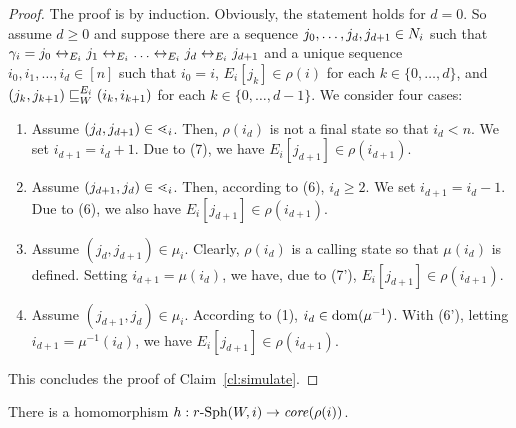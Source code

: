 \documentclass{LMCS}
\begin{document}
\begin{proof}
  The proof is by induction. Obviously, the statement holds for $d=0$. So
  assume $d \ge 0$ and suppose there are a sequence $j_0,\ldots,j_d,j_{d+1}
  \in \Nat_{i}$ such that $\gamma_{i} = j_0 \edge{E_i} j_1 \edge{E_i} \ldots
  \edge{E_i} j_d \edge{E_i} j_{d+1}$ and a unique sequence $i_0,i_1,\ldots,i_d
  \in [n]$ such that $i_0 = i$, $E_i[j_k] \in \rho(i)$ for each $k \in
  \{0,\ldots,d\}$, and $\wsimulate{E_i}{W}{(j_k,j_{k+1})}{(i_k,i_{k+1})}$ for
  each $k \in \{0,\ldots,d-1\}$. We consider four cases:
\begin{enumerate}[$\bullet$]
\item Assume $(j_d,j_{d+1}) \in \succord_i$. Then, $\rho(i_d)$ is not a final
  state so that $i_d < n$. We set $i_{d+1} = i_d + 1$. Due to (7), we have
  $E_i[j_{d+1}] \in \rho(i_{d+1})$.
\item Assume $(j_{d+1},j_d) \in \succord_i$. Then, according to (6), $i_d \ge
  2$. We set $i_{d+1} = i_d - 1$. Due to (6), we also have $E_i[j_{d+1}] \in
  \rho(i_{d+1})$.
\item Assume $(j_d,j_{d+1}) \in \mu_i$. Clearly, $\rho(i_d)$ is a calling
  state so that $\mu(i_d)$ is defined. Setting $i_{d+1} = \mu(i_d)$, we have,
  due to (7'), $E_i[j_{d+1}] \in \rho(i_{d+1})$.
\item Assume $(j_{d+1},j_d) \in \mu_i$. According to (1), $i_d \in
  \dom(\mu^{-1})$. With (6'), letting $i_{d+1} = \mu^{-1}(i_d)$, we have
  $E_i[j_{d+1}] \in \rho(i_{d+1})$.
\end{enumerate}
This concludes the proof of Claim~\ref{cl:simulate}.
\end{proof}



\begin{myclaim}\label{cl:forth}
  There is a homomorphism $h: \Sph{\radius}{W}{i} \rightarrow \core(\rho(i))$.
\end{myclaim}
\end{document}
